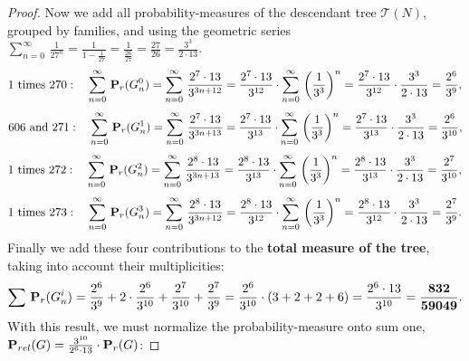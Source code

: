 \documentclass{amsart}
\theoremstyle{definition}
\theoremstyle{remark}
\begin{document}
\begin{proof}
\noindent
Now we add all probability-measures
of the descendant tree \(\mathcal{T}(N)\),
grouped by families,
and using the geometric series
\(\sum_{n=0}^{\infty}\,\frac{1}{27^n}
=\frac{1}{1-\frac{1}{27}}
=\frac{1}{\frac{26}{27}}
=\frac{27}{26}
=\frac{3^3}{2\cdot 13}\).
\begin{equation}
\label{eqn:270}
1 \text{ times 270}: \quad
\sum_{n=0}^{\infty}\,{\bf P}_r(G_n^0)=
\sum_{n=0}^{\infty}\,\frac{2^7\cdot 13}{3^{3n+12}}=
\frac{2^7\cdot 13}{3^{12}}\cdot\sum_{n=0}^{\infty}\,\left(\frac{1}{3^3}\right)^n=
\frac{2^7\cdot 13}{3^{12}}\cdot\frac{3^3}{2\cdot 13}=
\frac{2^6}{3^9},
\end{equation}
\begin{equation}
\label{eqn:271}
\text{606 and 271}: \quad
\sum_{n=0}^{\infty}\,{\bf P}_r(G_n^1)=
\sum_{n=0}^{\infty}\,\frac{2^7\cdot 13}{3^{3n+13}}=
\frac{2^7\cdot 13}{3^{13}}\cdot\sum_{n=0}^{\infty}\,\left(\frac{1}{3^3}\right)^n=
\frac{2^7\cdot 13}{3^{13}}\cdot\frac{3^3}{2\cdot 13}=
\frac{2^6}{3^{10}},
\end{equation}
\begin{equation}
\label{eqn:272}
1 \text{ times 272}: \quad
\sum_{n=0}^{\infty}\,{\bf P}_r(G_n^2)=
\sum_{n=0}^{\infty}\,\frac{2^8\cdot 13}{3^{3n+13}}=
\frac{2^8\cdot 13}{3^{13}}\cdot\sum_{n=0}^{\infty}\,\left(\frac{1}{3^3}\right)^n=
\frac{2^8\cdot 13}{3^{13}}\cdot\frac{3^3}{2\cdot 13}=
\frac{2^7}{3^{10}},
\end{equation}
\begin{equation}
\label{eqn:273}
1 \text{ times 273}: \quad
\sum_{n=0}^{\infty}\,{\bf P}_r(G_n^3)=
\sum_{n=0}^{\infty}\,\frac{2^8\cdot 13}{3^{3n+12}}=
\frac{2^8\cdot 13}{3^{12}}\cdot\sum_{n=0}^{\infty}\,\left(\frac{1}{3^3}\right)^n=
\frac{2^8\cdot 13}{3^{12}}\cdot\frac{3^3}{2\cdot 13}=
\frac{2^7}{3^9}.
\end{equation}
Finally we add these four contributions to the
\textbf{total measure of the tree}, taking into account their multiplicities:
\begin{equation}
\label{eqn:cc2}
\sum\,{\bf P}_{r}(G_n^i)=
\frac{2^6}{3^9}+2\cdot\frac{2^6}{3^{10}}+\frac{2^7}{3^{10}}+\frac{2^7}{3^9}=
\frac{2^6}{3^{10}}\cdot(3+2+2+6)=
\frac{2^6\cdot 13}{3^{10}}=
\frac{\bf 832}{\bf 59049}.
\end{equation}
With this result, we must normalize the probability-measure onto sum one,
\({\bf P}_{rel}(G)=\frac{3^{10}}{2^6\cdot 13}\cdot{\bf P}_{r}(G)\):
\renewcommand{\arraystretch}{1.2}
\begin{table}[ht]

\end{table}
\end{proof}
\end{document}
